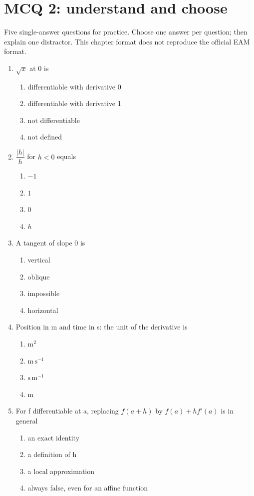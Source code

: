 \endgroup
\begingroup\small
{}\section*{MCQ 2: understand and choose}\label{C04-Q2}
Five single-answer questions for practice. Choose one answer per question; then explain one distractor. This chapter format does not reproduce the official EAM format.
\begin{enumerate}
\item $\sqrt{x}$ at 0 is
\begin{enumerate}[label=\Alph*.,itemsep=2pt]
\item differentiable with derivative 0
\item differentiable with derivative 1
\item not differentiable
\item not defined
\end{enumerate}
\item $\dfrac{|h|}{h}$ for $h<0$ equals
\begin{enumerate}[label=\Alph*.,itemsep=2pt]
\item $-1$
\item $1$
\item $0$
\item $h$
\end{enumerate}
\item A tangent of slope 0 is
\begin{enumerate}[label=\Alph*.,itemsep=2pt]
\item vertical
\item oblique
\item impossible
\item horizontal
\end{enumerate}
\item Position in m and time in s: the unit of the derivative is
\begin{enumerate}[label=\Alph*.,itemsep=2pt]
\item $\mathrm{m^2}$
\item $\mathrm{m\,s^{-1}}$
\item $\mathrm{s\,m^{-1}}$
\item $\mathrm{m}$
\end{enumerate}
\item For f differentiable at a, replacing $f(a+h)$ by $f(a)+hf\prime(a)$ is in general
\begin{enumerate}[label=\Alph*.,itemsep=2pt]
\item an exact identity
\item a definition of h
\item a local approximation
\item always false, even for an affine function
\end{enumerate}
\end{enumerate}
